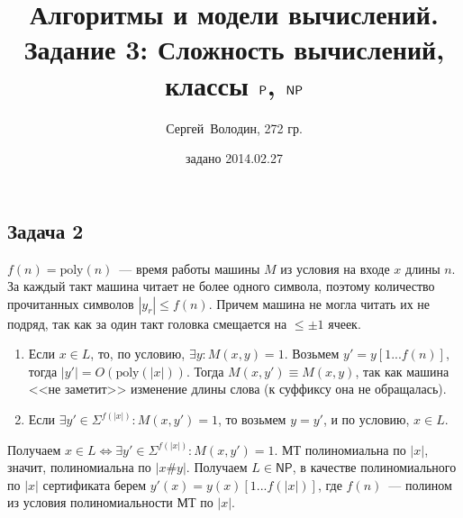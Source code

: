 \documentclass[a4paper]{article}
\date{задано 2014.02.27}
\author{Сергей~Володин, 272 гр.}
\title{Алгоритмы и модели вычислений.\\Задание 3: Сложность вычислений, классы ${\mathsf{P}}$, $\NP$}
\def\NP{{\mathsf{NP}}}
\begin{document}
\maketitle
\subsection*{Задача 2}
$f(n)=\mbox{poly}(n)$~--- время работы машины $M$ из условия на входе $x$ длины $n$. За каждый такт машина читает не более одного символа, поэтому количество прочитанных символов $|y_r|\leqslant f(n)$. Причем машина не могла читать их не подряд, так как за один такт головка смещается на $\leqslant\pm 1$ ячеек.\begin{enumerate}
\item Если $x\in L$, то, по условию, $\exists y\colon M(x,y)=1$. Возьмем $y'=y[1...f(n)]$, тогда $|y'|=O(\mbox{poly}(|x|))$. Тогда $M(x, y')\equiv M(x,y)$, так как машина <<не заметит>> изменение длины слова (к суффиксу она не обращалась).
\item Если $\exists y'\in\Sigma^{f(|x|)}\colon M(x,y')=1$, то возьмем $y=y'$, и по условию, $x\in L$.
\end{enumerate}
Получаем $x\in L\Leftrightarrow \exists y'\in\Sigma^{f(|x|)}\colon M(x,y')=1$. МТ полиномиальна по $|x|$, значит, полиномиальна по $|x\#y|$. Получаем $L\in\NP$, в качестве полиномиального по $|x|$ сертификата берем $y'(x)=y(x)[1...f(|x|)]$, где $f(n)$~--- полином из условия полиномиальности МТ по $|x|$.
\end{document}
